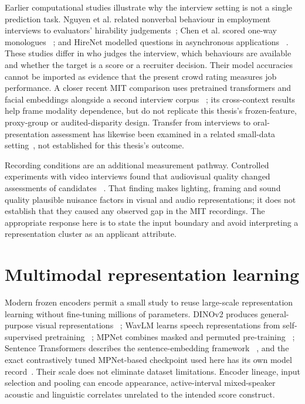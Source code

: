 Earlier computational studies illustrate why the interview setting is not a single prediction
task. Nguyen et al. related nonverbal behaviour in employment interviews to evaluators'
hirability judgements~\cite{Nguyen2014HireMe}; Chen et al. scored one-way monologues
~\cite{Chen2016Monologue}; and HireNet modelled questions in asynchronous applications
~\cite{Hemamou2019HireNet}.
These studies differ in who judges the interview, which behaviours are available and whether the
target is a score or a recruiter decision. Their model accuracies cannot be imported as evidence
that the present crowd rating measures job performance. A closer recent MIT comparison uses
pretrained transformers and facial embeddings alongside a second interview corpus
~\cite{Fithian2025}; its cross-context results help frame modality dependence, but do not
replicate this thesis's frozen-feature, proxy-group or audited-disparity design. Transfer from
interviews to oral-presentation assessment has likewise been examined in a related small-data
setting~\cite{Tun2023Transfer}, not established for this thesis's outcome.

Recording conditions are an additional measurement pathway. Controlled experiments with video
interviews found that audiovisual quality changed assessments of candidates
~\cite{Fiechter2018}. That finding makes lighting, framing and sound quality plausible
nuisance factors in visual and audio representations; it does not establish that they caused
any observed gap in the MIT recordings. The appropriate response here is to state the input
boundary and avoid interpreting a representation cluster as an applicant attribute.

\section{Multimodal representation learning}

Modern frozen encoders permit a small study to reuse large-scale representation learning without
fine-tuning millions of parameters. DINOv2 produces general-purpose visual representations
~\cite{Oquab2024}; WavLM learns speech representations from self-supervised pretraining
~\cite{Chen2022WavLM}; MPNet combines masked and permuted pre-training
~\cite{Song2020MPNet}; Sentence Transformers describes the sentence-embedding framework
~\cite{Reimers2019}, and the exact contrastively tuned MPNet-based checkpoint used here has its
own model record~\cite{SentenceTransformersAllMPNet2025}. Their scale does
not eliminate dataset limitations. Encoder lineage, input selection and pooling can encode
appearance, active-interval mixed-speaker acoustic and linguistic correlates unrelated to the intended score
construct.

